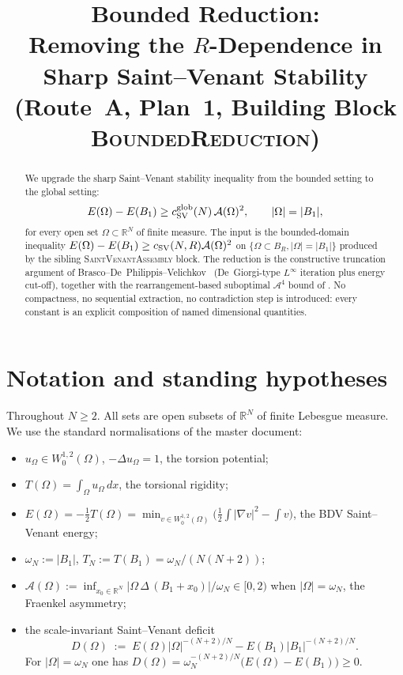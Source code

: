 \documentclass[11pt]{article}
\title{Bounded Reduction:\\
Removing the $R$-Dependence in Sharp Saint--Venant Stability\\
(Route~A, Plan~1, Building Block \textsc{BoundedReduction})}
\author{}
\date{}
\theoremstyle{definition}
\newcommand{\R}{\mathbb{R}}
\newcommand{\abs}[1]{\left|#1\right|}
\newcommand{\Fr}{\mathcal{A}}
\newcommand{\Om}{\Omega}
\begin{document}
\maketitle

\begin{abstract}
We upgrade the sharp Saint--Venant stability inequality from the
bounded setting to the global setting:
\[
   E(\Om)-E(B_1)\ge c_{\rm SV}^{\rm glob}(N)\,\Fr(\Om)^{2},
   \qquad |\Om|=|B_{1}|,
\]
for every open set $\Om\subset\R^N$ of finite measure. The input is
the bounded-domain inequality
$E(\Om)-E(B_{1})\ge c_{\rm SV}(N,R)\Fr(\Om)^{2}$ on
$\{\Om\subset B_{R},|\Om|=|B_{1}|\}$ produced by the sibling
\textsc{SaintVenantAssembly} block. The reduction is the constructive
truncation argument of Brasco--De~Philippis--Velichkov~\cite[Lemmas~5.1
and~5.3]{BDV} (De~Giorgi-type $L^{\infty}$ iteration plus
energy cut-off), together with the rearrangement-based suboptimal
$\Fr^{4}$ bound of \cite[Lemma~5.2]{BDV}. No compactness, no
sequential extraction, no contradiction step is introduced: every
constant is an explicit composition of named dimensional quantities.
\end{abstract}

\section{Notation and standing hypotheses}\label{sec:notation}

Throughout $N\ge 2$. All sets are open subsets of $\R^{N}$ of finite
Lebesgue measure. We use the standard normalisations of the master
document:
\begin{itemize}
\item $u_{\Om}\in W^{1,2}_{0}(\Om)$, $-\Delta u_{\Om}=1$, the torsion
potential;
\item $T(\Om)=\int_{\Om}u_{\Om}\,dx$, the torsional rigidity;
\item $E(\Om)=-\tfrac12 T(\Om)=\min_{v\in W^{1,2}_{0}(\Om)}
\bigl(\tfrac12\int|\nabla v|^{2}-\int v\bigr)$, the BDV Saint--Venant
energy;
\item $\omega_{N}:=|B_{1}|$, $T_{N}:=T(B_{1})=\omega_{N}/(N(N+2))$;
\item $\Fr(\Om):=\inf_{x_{0}\in\R^{N}}|\Om\,\Delta\,(B_{1}+x_{0})|/\omega_{N}\in[0,2)$
when $|\Om|=\omega_{N}$, the Fraenkel asymmetry;
\item the scale-invariant Saint--Venant deficit
\[
   D(\Om)\;:=\;E(\Om)\abs{\Om}^{-(N+2)/N}
              -E(B_{1})\abs{B_{1}}^{-(N+2)/N}.
\]
For $|\Om|=\omega_{N}$ one has
$D(\Om)=\omega_{N}^{-(N+2)/N}\bigl(E(\Om)-E(B_{1})\bigr)\ge 0$.
\end{itemize}
\end{document}
